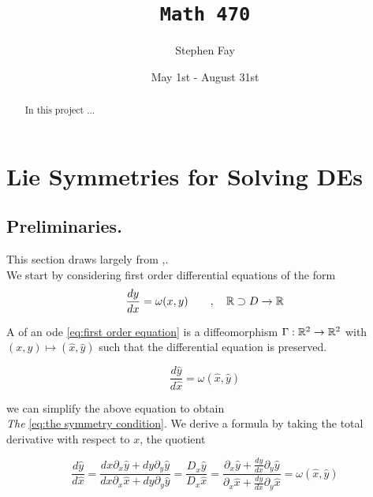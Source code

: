 \documentclass[12pt]{article}
\begin{document}
 
 
\title{\texttt{Math 470}}
\author{Stephen Fay}
\date{May 1st - August 31st}
\maketitle


\begin{abstract}
    In this project ...
\end{abstract}

\tableofcontents

\section{Lie Symmetries for Solving DEs}

\subsection{Preliminaries.}

This section draws largely from \cite{R-Steinhour},\cite{Symmetry-methods}.\\ We start by considering first order differential equations of the form
\begin{equation}\label{eq:first order equation}
    \frac{dy}{dx} = \omega(x,y)\qquad,\quad \mathbb{R} \supset D \to \mathbb{R}
\end{equation}

A  of an ode \eqref{eq:first order equation} is a diffeomorphism $\Gamma : \mathbb{R}^2\to\mathbb{R}^2$ with $(x,y)\mapsto (\hat x,\hat y)$ such that the differential equation is preserved.

$$\frac{d\hat y}{d\hat x} = \omega(\hat x,\hat y)$$

we can simplify the above equation to obtain\\ \textit{The } \eqref{eq:the symmetry condition}. We derive a formula by taking the total derivative with respect to $x$, the quotient 

\begin{equation}\label{eq:the symmetry condition}
    \frac{d\hat y}{d\hat x} = \frac{dx \partial_x \hat y + dy \partial_y\hat y}{dx \partial_x \hat x + dy\partial_y \hat y} = \frac{D_x \hat y}{D_x \hat x} = \frac{\partial_x \hat y + \frac{dy}{dx}\partial_y\hat y}{\partial_x \hat x + \frac{dy}{dx}\partial_y\hat x} = \omega(\hat x,\hat y)
\end{equation}
\end{document}
